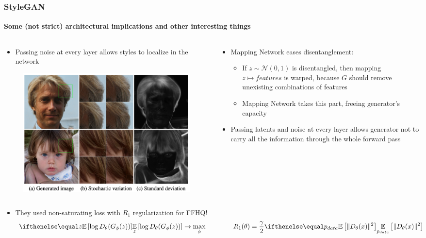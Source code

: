 \documentclass[10pt]{beamer}
\begin{document}
\begin{frame}
\frametitle{StyleGAN}
\framesubtitle{Some (not strict) architectural implications and other interesting things}

\begin{columns}[T]
\begin{column}{5cm}
\begin{itemize}
\item Passing noise at every layer allows styles to localize in the network
\end{itemize}

\begin{figure}
    \centering
    \includegraphics[width=\textwidth]{images/stylegan-local-styles}
\end{figure}
\end{column}

\begin{column}{7cm}
\begin{itemize}
    \item Mapping Network eases disentanglement:
    \begin{itemize}
        \item If $z \sim \mathcal{N}(0,1)$ is disentangled, then mapping $z \mapsto features$ is warped, because $G$ should remove unexisting combinations of features
        \item Mapping Network takes this part, freeing generator's capacity
    \end{itemize}
    \item Passing latents and noise at every layer allows generator not to carry all the information through the whole forward pass
\end{itemize}
\end{column}
\end{columns}

\begin{itemize}
    \item They used non-saturating loss with $R_1$ regularization for FFHQ!
\[
\expect[z]{\log D_\theta(G_\phi(z))} \to \max_\phi \qquad\qquad R_1(\theta) = \frac{\gamma}{2}\expect[p_{data}]{\Vert D_\theta (x) \Vert^2}
\]
\end{itemize}

\end{frame}
\end{document}
